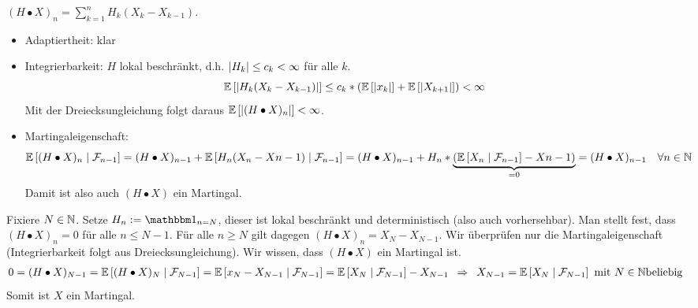 \begin{proof_equiv}
	\hinrichtung $(H \bullet X)_n = \sum_{k=1}^n H_k (X_k - X_{k-1})$.
	\begin{itemize}
		\item Adaptiertheit: klar
		\item Integrierbarkeit: $H$ lokal beschränkt, d.h. $\left| H_k \right| \le c_k < \infty$ für alle $k$.
		\begin{equation*}
			\mathbb{E} \left[ \left| H_k (X_k - X_{k-1}) \right| \right] \le c_k * \left( \mathbb{E} \left[ \left| x_k \right| \right] + \mathbb{E} \left[ \left| X_{k+1} \right| \right] \right) < \infty
		\end{equation*}
		Mit der Dreiecksungleichung folgt daraus $\mathbb{E} \left[ \left| (H \bullet X)_n \right| \right] < \infty$.
		\item Martingaleigenschaft: 
		\begin{equation*}
			\mathbb{E} \left[ (H \bullet X)_n \mid \mathcal{F}_{n-1} \right] = (H \bullet X)_{n-1} + \mathbb{E} \left[ H_n (X_n - X{n-1}) \mid \mathcal{F}_{n-1} \right]
			=  (H \bullet X)_{n-1} + H_n * \underbrace{\left( \mathbb{E} \left[ X_n \mid \mathcal{F}_{n-1} \right] - X{n-1} \right)}_{=0} 
			=(H \bullet X)_{n-1} \quad \forall n \in \mathbb{N}
		\end{equation*}
		Damit ist also auch $(H \bullet X)$ ein Martingal.		
	\end{itemize}
	\rueckrichtung Fixiere $N \in \mathbb{N}$. Setze $H_n \defeq \one_{n = N}$, dieser ist lokal beschränkt und deterministisch (also auch vorhersehbar). Man stellt fest, dass $(H \bullet X)_n = 0$ für alle $n \le N-1$. Für alle $n \ge N$ gilt dagegen $(H \bullet X)_n = X_N - X_{N-1}$. Wir überprüfen nur die Martingaleigenschaft (Integrierbarkeit folgt aus Dreiecksungleichung). Wir wissen, dass $(H \bullet X)$ ein Martingal ist. 
	\begin{align*}
		0 = (H \bullet X)_{N-1} = \mathbb{E} \left[ (H \bullet X)_N \mid \mathcal{F}_{N-1} \right] = 
		\mathbb{E} \left[ x_N - X_{N-1} \mid \mathcal{F}_{N-1} \right] = \mathbb{E} \left[ X_N \mid \mathcal{F}_{N-1} \right] - X_{N-1}
		\enskip \Rightarrow \enskip X_{N-1} = \mathbb{E} \left[ X_N \mid \mathcal{F}_{N-1} \right] \text{ mit } N \in \mathbb{N} \text{beliebig}
	\end{align*}
	Somit ist $X$ ein Martingal.
\end{proof_equiv}

